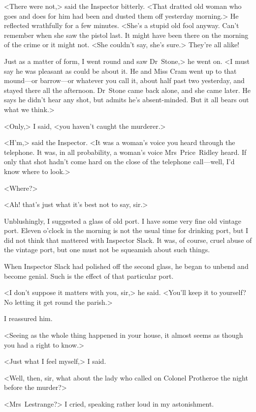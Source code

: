 <There were not,> said the Inspector bitterly. <That dratted old woman who goes and does for him had been and dusted them off yesterday morning.> He reflected wrathfully for a few minutes. <She's a stupid old fool anyway. Can't remember when she saw the pistol last. It might have been there on the morning of the crime or it might not. <She couldn't say, she's sure.> They're all alike!

Just as a matter of form, I went round and saw Dr~Stone,> he went on. <I must say he was pleasant as could be about it. He and Miss Cram went up to that mound—or barrow—or whatever you call it, about half past two yesterday, and stayed there all the afternoon. Dr~Stone came back alone, and she came later. He says he didn't hear any shot, but admits he's absent-minded. But it all bears out what we think.>

<Only,> I said, <you haven't caught the murderer.>

<H'm,> said the Inspector. <It was a woman's voice you heard through the telephone. It was, in all probability, a woman's voice Mrs~Price~Ridley heard. If only that shot hadn't come hard on the close of the telephone call—well, I'd know where to look.>

<Where?>

<Ah! that's just what it's best not to say, sir.>

Unblushingly, I suggested a glass of old port. I have some very fine old vintage port. Eleven o'clock in the morning is not the usual time for drinking port, but I did not think that mattered with Inspector Slack. It was, of course, cruel abuse of the vintage port, but one must not be squeamish about such things.

When Inspector Slack had polished off the second glass, he began to unbend and become genial. Such is the effect of that particular port.

<I don't suppose it matters with you, sir,> he said. <You'll keep it to yourself? No letting it get round the parish.>

I reassured him.

<Seeing as the whole thing happened in your house, it almost seems as though you had a right to know.>

<Just what I feel myself,> I said.

<Well, then, sir, what about the lady who called on Colonel Protheroe the night before the murder?>

<Mrs~Lestrange?> I cried, speaking rather loud in my astonishment.

